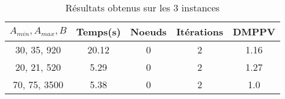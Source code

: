 \documentclass[main.tex]{subfiles}
\begin{document}
\thispagestyle{empty}

\begin{table}
    \centering
    \caption{Résultats obtenus sur les 3 instances}
    \begin{tabular}{
    ccccc}
\hline	
	\textbf{$A_{min}, A_{max}, B$} &\textbf{Temps(s)} &\textbf{Noeuds} &\textbf{Itérations} &\textbf{DMPPV}\\
	\hline

	

	
30, 35, 920 &20.12 &0 &2 &1.16\\
20, 21, 520 &5.29 &0 &2 &1.27\\
70, 75, 3500 &5.38 &0 &2 &1.0\\
    \end{tabular}
\end{table}
\end{document}

